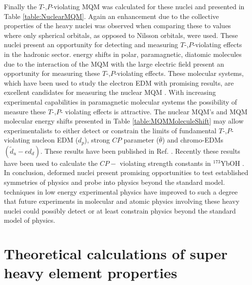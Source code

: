 \documentclass[10pt,a4paper, twoside, openright]{report}
\begin{document}
\linebreak
Finally the $T$-,$P$-violating MQM was calculated for these nuclei and presented in Table \ref{table:NuclearMQM}. Again an enhancement due to the collective properties of the heavy nuclei was observed when comparing these to values where only spherical orbitals, as opposed to Nilsson orbitals, were used. These nuclei present an opportunity for detecting and measuring $T$-,$P$-violating effects in the hadronic sector. energy shifts in polar, paramagnetic, diatomic molecules due to the interaction of the MQM with the large electric field present an opportunity for measuring these $T$-,$P$-violating effects. These molecular systems, which have been used to study the electron EDM with promising results, are excellent candidates for measuring the nuclear MQM  \cite{Skripnikov2017, Skripnikov2014ThO}. With increasing experimental capabilities  in paramagnetic molecular systems the possibility of measure these $T$-,$P$- violating effects is attractive. The nuclear MQM's and MQM molecular energy shifts presented in Table \ref{table:MQMMoleculeShift} may allow experimentalists to either detect or constrain the limits of fundamental $T$-,$P$- violating nucleon EDM ($d_p$), strong $CP$ parameter ($\bar{\theta}$) and chromo-EDMs $(\tilde{d}_{u} - e{d}_d) $. These results have been published in Ref. \cite{LFMQM2018}. Recently these results have been used to calculate the $CP-$ violating strength constants in $^{173}$YbOH \cite{MSF2019}.\\
\linebreak
In conclusion, deformed nuclei present promising opportunities to test established symmetries of physics and probe into physics beyond the standard model. techniques in low energy experimental physics have improved to such a degree that future experiments in molecular and atomic physics involving these heavy nuclei could possibly detect or at least constrain physics beyond the standard model of physics.
\part{Theoretical calculations of super heavy element properties}
\end{document}
